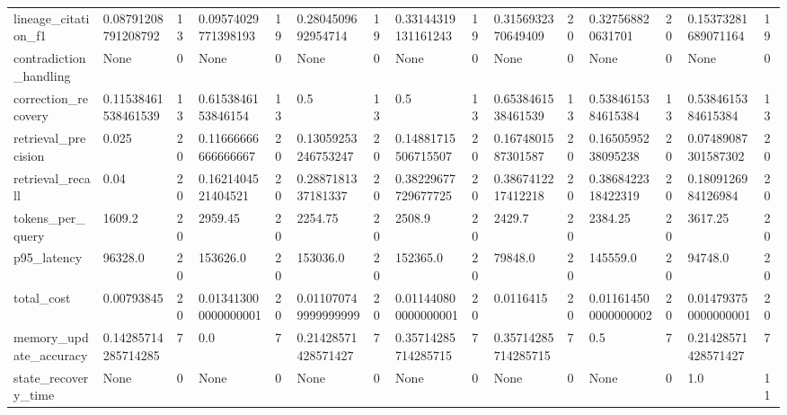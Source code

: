 \begin{tabular}{lllllllllllllll}
lineage\_citation\_f1 & 0.08791208791208792 & 13 & 0.09574029771398193 & 19 & 0.2804509692954714 & 19 & 0.33144319131161243 & 19 & 0.3156932370649409 & 20 & 0.327568820631701 & 20 & 0.15373281689071164 & 19 \\
contradiction\_handling & None & 0 & None & 0 & None & 0 & None & 0 & None & 0 & None & 0 & None & 0 \\
correction\_recovery & 0.11538461538461539 & 13 & 0.6153846153846154 & 13 & 0.5 & 13 & 0.5 & 13 & 0.6538461538461539 & 13 & 0.5384615384615384 & 13 & 0.5384615384615384 & 13 \\
retrieval\_precision & 0.025 & 20 & 0.11666666666666667 & 20 & 0.13059253246753247 & 20 & 0.14881715506715507 & 20 & 0.1674801587301587 & 20 & 0.1650595238095238 & 20 & 0.07489087301587302 & 20 \\
retrieval\_recall & 0.04 & 20 & 0.1621404521404521 & 20 & 0.2887181337181337 & 20 & 0.38229677729677725 & 20 & 0.3867412217412218 & 20 & 0.3868422318422319 & 20 & 0.1809126984126984 & 20 \\
tokens\_per\_query & 1609.2 & 20 & 2959.45 & 20 & 2254.75 & 20 & 2508.9 & 20 & 2429.7 & 20 & 2384.25 & 20 & 3617.25 & 20 \\
p95\_latency & 96328.0 & 20 & 153626.0 & 20 & 153036.0 & 20 & 152365.0 & 20 & 79848.0 & 20 & 145559.0 & 20 & 94748.0 & 20 \\
total\_cost & 0.00793845 & 20 & 0.013413000000000001 & 20 & 0.011070749999999999 & 20 & 0.011440800000000001 & 20 & 0.0116415 & 20 & 0.011614500000000002 & 20 & 0.014793750000000001 & 20 \\
memory\_update\_accuracy & 0.14285714285714285 & 7 & 0.0 & 7 & 0.21428571428571427 & 7 & 0.35714285714285715 & 7 & 0.35714285714285715 & 7 & 0.5 & 7 & 0.21428571428571427 & 7 \\
state\_recovery\_time & None & 0 & None & 0 & None & 0 & None & 0 & None & 0 & None & 0 & 1.0 & 11 \\
\end{tabular}
